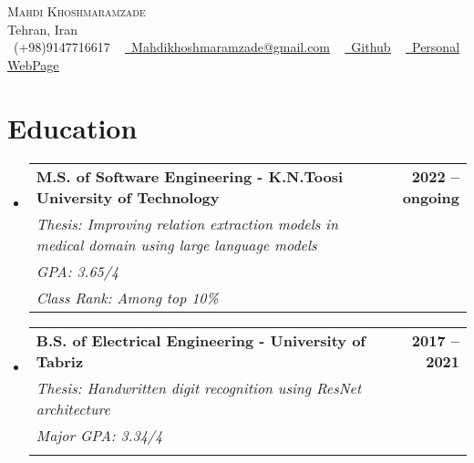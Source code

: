 \documentclass[letterpaper,11pt]{article}
\makeatletter
\newcommand{\resumeSubheadingeducation}[7]{
	\vspace{-2pt}\item
	\begin{tabular*}{1.0\textwidth}[t]{l@{\extracolsep{\fill}}r}
		\textbf{#1} & \textbf{\small #2} \\
		\textit{\small#3} & \textit{\small #4} \\
		\textit{\small#5} & \textit{\small #6} \\
		\textit{\small#7}
	\end{tabular*}\vspace{-7pt}
}
\newcommand{\resumeSubHeadingListStart}{\begin{itemize}[leftmargin=0.0in, label={}]}
\newcommand{\resumeSubHeadingListEnd}{\end{itemize}}
\makeatother
\begin{document}
	
	
	\begin{center}
		{\Huge \scshape \textcolor{title-color}{Mahdi Khoshmaramzade}} \\ \vspace{1pt}
		Tehran, Iran \\ \vspace{1pt}
		\small \raisebox{-0.1\height}\faPhone\ (+98)9147716617 ~ \href{mailto:Mahdikhoshmaramzade@gmail.com}{\raisebox{-0.2\height}\faEnvelope\  \underline{Mahdikhoshmaramzade@gmail.com}} ~
		\href{https://github.com/mahdi-khoshmaram}{\raisebox{-0.2\height}\faGithub\  \underline{Github}} ~
		\href{https://mahdi-khoshmaram.github.io/}{\raisebox{-0.2\height}\faGlobe\  \underline{Personal WebPage}}
		\vspace{-1pt}
	\end{center}
	
	
	\section{\textcolor{title-color}{Education}}
	\resumeSubHeadingListStart
	\resumeSubheadingeducation
	{M.S. of Software Engineering - K.N.Toosi University of Technology}{2022 -- ongoing}
	{Thesis:  Improving relation extraction models in medical domain using large language models}{}{GPA: 3.65/4}{}{Class Rank: Among top 10\%}
	
	\resumeSubheadingeducation
	{B.S. of Electrical Engineering - University of Tabriz}{2017 -- 2021}
	{Thesis: Handwritten digit recognition using ResNet architecture}{}{Major GPA: 3.34/4}{}{}
	
	\resumeSubHeadingListEnd
	
\end{document}

